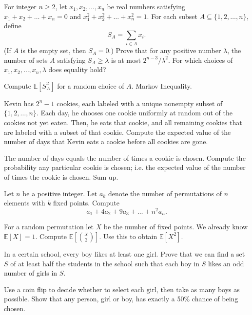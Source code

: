 \documentclass[11pt]{scrartcl}
\newcommand\EE{\mathbb E}
\begin{document}
\begin{problem}
  [USAMO 2012/6] For integer $n\geq2$,
  let $x_1, x_2, \ldots, x_n$ be real numbers satisfying $x_1+x_2+\ldots+x_n=0$
  and $x_1^2+x_2^2+\ldots+x_n^2=1$.
  For each subset $A\subseteq\{1, 2, \ldots, n\}$, define\[S_A=\sum_{i\in A}x_i.\](If $A$ is the empty set,
  then $S_A=0$.) Prove that for any positive number $\lambda$,
  the number of sets $A$ satisfying $S_A\geq\lambda$ is at most $2^{n-3}/\lambda^2$.
  For which choices of $x_1, x_2, \ldots, x_n, \lambda$ does equality hold?
  \begin{sketch}
    Compute $\EE[S_A^2]$ for a random choice of $A$.
    Markov Inequality.
  \end{sketch}
\end{problem}


\begin{problem}
   Kevin has $2^n-1$ cookies,
  each labeled with a unique nonempty subset of $\{1,2,\dots,n\}$.
  Each day, he chooses one cookie uniformly at random out of the cookies not yet eaten.
  Then, he eats that cookie, and all remaining cookies that are labeled with a subset of that cookie.
  Compute the expected value of the number of days that Kevin eats a cookie before all cookies are gone.
  \begin{sketch}
    The number of days equals the number of times a cookie is chosen.
    Compute the probability any particular cookie is chosen;
    {i.e.} the expected value of the number of times the cookie is chosen.
    Sum up.
  \end{sketch}
\end{problem}

\begin{problem}
  Let $n$ be a positive integer.
  Let $a_k$ denote the number of permutations of $n$ elements with $k$ fixed points.
  Compute \[ a_1 + 4a_2 + 9a_3 + \dots + n^2a_n. \]
  \begin{sketch}
    For a random permutation let $X$ be the number of fixed points.
    We already know $\EE[X] = 1$.
    Compute $\EE[\binom{X}{2}]$.
    Use this to obtain $\EE[X^2]$.
  \end{sketch}
\end{problem}

\begin{problem}
  [Russia 1999] In a certain school, every boy likes at least one girl.
  Prove that we can find a set $S$ of at least half the students in the school
  such that each boy in $S$ likes an odd number of girls in $S$.
  \begin{sketch}
    Use a coin flip to decide whether to select each girl, then take as many boys as possible.
    Show that any person, girl or boy, has exactly a 50\% chance of being chosen.
  \end{sketch}
\end{problem}
\end{document}
